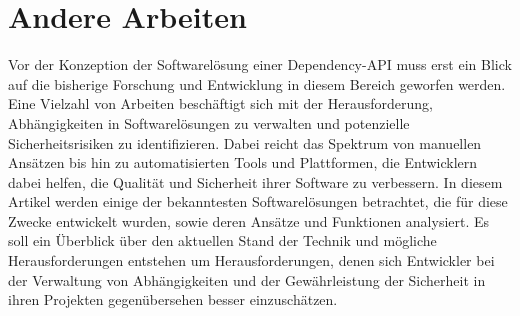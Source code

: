 \section{Andere Arbeiten} \label{sec:Andere}
Vor der Konzeption der Softwarelösung einer Dependency-API muss erst ein Blick auf die bisherige Forschung und Entwicklung in diesem Bereich geworfen werden.
Eine Vielzahl von Arbeiten beschäftigt sich mit der Herausforderung, Abhängigkeiten in Softwarelösungen zu verwalten und potenzielle Sicherheitsrisiken zu identifizieren.
Dabei reicht das Spektrum von manuellen Ansätzen bis hin zu automatisierten Tools und Plattformen, die Entwicklern dabei helfen, die Qualität und Sicherheit ihrer Software zu verbessern.
In diesem Artikel werden einige der bekanntesten Softwarelösungen betrachtet, die für diese Zwecke entwickelt wurden, sowie deren Ansätze und Funktionen analysiert.
Es soll ein Überblick über den aktuellen Stand der Technik und mögliche Herausforderungen entstehen um Herausforderungen, denen sich Entwickler bei der Verwaltung von Abhängigkeiten und der Gewährleistung der Sicherheit in ihren Projekten gegenübersehen besser einzuschätzen.




